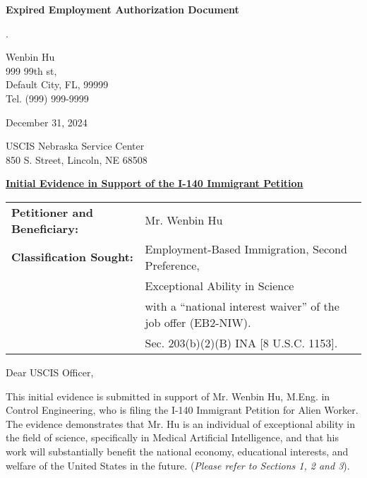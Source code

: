 \documentclass{article}
\begin{document}
% 

\vspace*{\fill}
\begin{center}

{\LARGE \bf
Expired Employment Authorization Document
}

\end{center}
\vspace*{\fill}

.

% 



\begin{flushright}
Wenbin Hu\\
999 99th st,\\
Default City, FL, 99999\\
Tel. (999) 999-9999
\end{flushright}

December 31, 2024

\label{IE}

USCIS Nebraska Service Center\\
850 S. Street, Lincoln, NE 68508

\underline{\bf Initial Evidence in Support of the I-140 Immigrant Petition}

\begin{tabular}{ll}
{\bf Petitioner and Beneficiary:} & Mr. Wenbin Hu \\
{\bf Classification Sought:} & Employment-Based Immigration, Second Preference, \\
& Exceptional Ability in Science \\
& with a “national interest waiver” of the job offer (EB2-NIW).\\
& Sec. 203(b)(2)(B) INA [8 U.S.C. 1153].
\end{tabular}
\vspace{2\baselineskip}

Dear USCIS Officer,

This initial evidence is submitted in support of Mr. Wenbin Hu, M.Eng. in Control Engineering, who is filing the I-140 Immigrant Petition for Alien Worker. The evidence demonstrates that Mr. Hu is an individual of exceptional ability in the field of science, specifically in Medical Artificial Intelligence, and that his work will substantially benefit the national economy, educational interests, and welfare of the United States in the future. ({\it Please refer to Sections 1, 2 and 3}).
\end{document}
